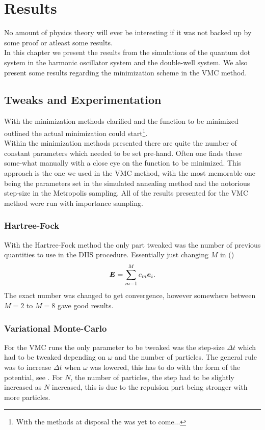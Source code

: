 \chapter{Results \label{chapter:6}}
    No amount of physics theory will ever be interesting if it was not backed
    up by some proof or atleast some results. \\
    In this chapter we present the results from the simulations of the quantum
    dot system in the harmonic oscillator system and the double-well system. We
    also present some results regarding the minimization scheme in the VMC
    method.

\section{Tweaks and Experimentation}
    With the minimization methods clarified and the function to be minimized
    outlined the actual minimization could start\footnote{With the methods at
    disposal the  was yet to come...}. \\
    Within the minimization methods presented there are quite the number of
    constant parameters which needed to be set pre-hand. Often one finds these
    some-what manually with a close eye on the function to be minimized. This
    approach is the one we used in the VMC method, with the most memorable one
    being the parameters set in the simulated annealing method and the
    notorious step-size in the Metropolis sampling. All of the results
    presented for the VMC method were run with importance sampling.

\subsection{Hartree-Fock}
    With the Hartree-Fock method the only part tweaked was the number of
    previous quantities to use in the DIIS procedure. Essentially just changing
    $M$ in ()
        \begin{equation}
            \blds{E} = \suml{m=1}{M} c_m\blds{e}_i.
        \end{equation}
    The exact number was changed to get convergence, however somewhere between
    $M=2$ to $M=8$ gave good results.

\subsection{Variational Monte-Carlo}
    For the VMC runs the only parameter to be tweaked was the step-size $\Delta
    t$ which had to be tweaked depending on $\omega$ and the number of
    particles. The general rule was to increase $\Delta t$ when $\omega$ was
    lowered, this has to do with the form of the potential, see
    . For $N$, the number of particles, the step had to be
    slightly increased as $N$ increased, this is due to the repulsion part
    being stronger with more particles.

